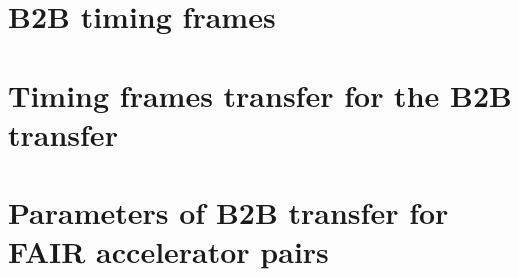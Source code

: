 \documentclass[12pt,twoside]{report}
\begin{document}
%
\appendix
\chapter{B2B timing frames}

\chapter{Timing frames transfer for the B2B transfer}

\chapter{Parameters of B2B transfer for FAIR accelerator pairs}






\renewcommand\chaptername{Publications}
\pagestyle{empty}


\renewcommand\chaptername{}
\pagestyle{empty}

%
\end{document}
